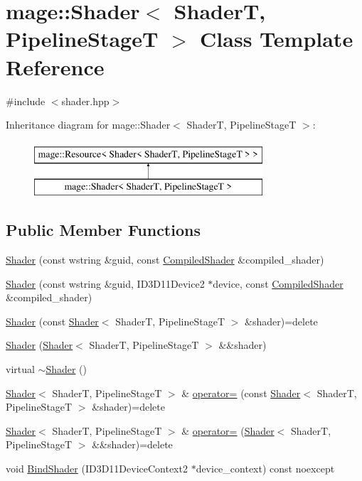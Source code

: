 \hypertarget{classmage_1_1_shader}{}\section{mage\+:\+:Shader$<$ ShaderT, Pipeline\+StageT $>$ Class Template Reference}
\label{classmage_1_1_shader}


{\ttfamily \#include $<$shader.\+hpp$>$}

Inheritance diagram for mage\+:\+:Shader$<$ ShaderT, Pipeline\+StageT $>$\+:\begin{figure}[H]
\begin{center}
\leavevmode
\includegraphics[height=2.000000cm]{classmage_1_1_shader}
\end{center}
\end{figure}
\subsection*{Public Member Functions}
\begin{DoxyCompactItemize}
\item 
\hyperlink{classmage_1_1_shader_ab5b6db34961dd3d65bfe4ec1452966e6}{Shader} (const wstring \&guid, const \hyperlink{structmage_1_1_compiled_shader}{Compiled\+Shader} \&compiled\+\_\+shader)
\item 
\hyperlink{classmage_1_1_shader_a871672eab60ad6994132bddc7802b817}{Shader} (const wstring \&guid, I\+D3\+D11\+Device2 $\ast$device, const \hyperlink{structmage_1_1_compiled_shader}{Compiled\+Shader} \&compiled\+\_\+shader)
\item 
\hyperlink{classmage_1_1_shader_a512a10b41172e984d8f6983497bcc9e5}{Shader} (const \hyperlink{classmage_1_1_shader}{Shader}$<$ ShaderT, Pipeline\+StageT $>$ \&shader)=delete
\item 
\hyperlink{classmage_1_1_shader_a9d87b88ded8e6874d061cb8c54d6a5e9}{Shader} (\hyperlink{classmage_1_1_shader}{Shader}$<$ ShaderT, Pipeline\+StageT $>$ \&\&shader)
\item 
virtual \hyperlink{classmage_1_1_shader_a10a954f75331d93c9549b2db5a2c838e}{$\sim$\+Shader} ()
\item 
\hyperlink{classmage_1_1_shader}{Shader}$<$ ShaderT, Pipeline\+StageT $>$ \& \hyperlink{classmage_1_1_shader_a235c45ff470f15367cc7381da0f01130}{operator=} (const \hyperlink{classmage_1_1_shader}{Shader}$<$ ShaderT, Pipeline\+StageT $>$ \&shader)=delete
\item 
\hyperlink{classmage_1_1_shader}{Shader}$<$ ShaderT, Pipeline\+StageT $>$ \& \hyperlink{classmage_1_1_shader_a2fa066425e397523b3ce181e5dc46c9d}{operator=} (\hyperlink{classmage_1_1_shader}{Shader}$<$ ShaderT, Pipeline\+StageT $>$ \&\&shader)=delete
\item 
void \hyperlink{classmage_1_1_shader_a64ad7404bd0fccc96debd67a4ba4beed}{Bind\+Shader} (I\+D3\+D11\+Device\+Context2 $\ast$device\+\_\+context) const noexcept
\end{DoxyCompactItemize}
